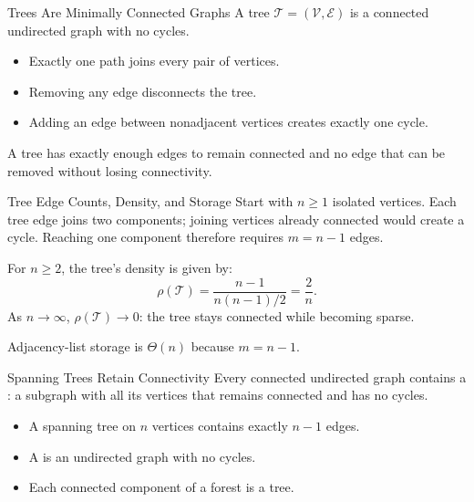 \documentclass[aspectratio=169,11pt]{beamer}
\begin{document}
\begin{frame}{Trees Are Minimally Connected Graphs}
  A tree $\mathcal T=(\mathcal V,\mathcal E)$ is a connected undirected graph
  with no cycles.

  \vspace{0.8em}
  \begin{itemize}\setlength{\itemsep}{0.8em}
    \item Exactly one path joins every pair of vertices.
    \item Removing any edge disconnects the tree.
    \item Adding an edge between nonadjacent vertices creates exactly one cycle.
  \end{itemize}

  \vspace{0.5em}
  A tree has exactly enough edges to remain connected and no edge that can be
  removed without losing connectivity.
\end{frame}

\begin{frame}{Tree Edge Counts, Density, and Storage}
  Start with $n\geq1$ isolated vertices. Each tree edge joins two components;
  joining vertices already connected would create a cycle.
  Reaching one component therefore requires $m=n-1$ edges.

  \vspace{0.6em}
  For $n\geq2$, the tree's density is given by:
  \[
    \rho(\mathcal T)=\frac{n-1}{n(n-1)/2}=\frac{2}{n}.
  \]
  As $n\to\infty$, $\rho(\mathcal T)\to0$: the tree stays connected while
  becoming sparse.

  \vspace{0.7em}
  Adjacency-list storage is $\Theta(n)$ because $m=n-1$.
\end{frame}

\begin{frame}{Spanning Trees Retain Connectivity}
  Every connected undirected graph contains a : a subgraph
  with all its vertices that remains connected and has no cycles.

  \vspace{0.8em}
  \begin{itemize}\setlength{\itemsep}{0.8em}
    \item A spanning tree on $n$ vertices contains exactly $n-1$ edges.
    \item A  is an undirected graph with no cycles.
    \item Each connected component of a forest is a tree.
  \end{itemize}
\end{frame}
\end{document}
